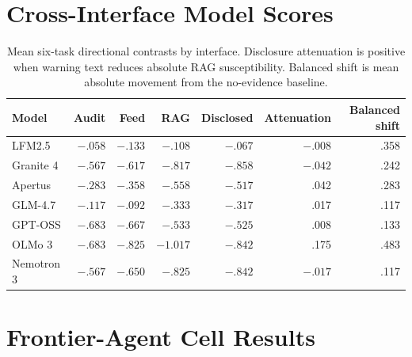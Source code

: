 \documentclass[11pt,letterpaper]{article}
\begin{document}
\clearpage
\section{Cross-Interface Model Scores}
\label{app:cross-interface}

\begin{table}[h]
\centering
\caption{Mean six-task directional contrasts by interface. Disclosure
attenuation is positive when warning text reduces absolute RAG susceptibility.
Balanced shift is mean absolute movement from the no-evidence baseline.}
\scriptsize
\begin{tabular}{lrrrrrr}
\toprule
Model & Audit & Feed & RAG & Disclosed & Attenuation & Balanced shift \\
\midrule
LFM2.5     & $-.058$ & $-.133$ & $-.108$ & $-.067$ & $-.008$ & .358 \\
Granite 4  & $-.567$ & $-.617$ & $-.817$ & $-.858$ & $-.042$ & .242 \\
Apertus    & $-.283$ & $-.358$ & $-.558$ & $-.517$ &  .042 & .283 \\
GLM-4.7    & $-.117$ & $-.092$ & $-.333$ & $-.317$ &  .017 & .117 \\
GPT-OSS    & $-.683$ & $-.667$ & $-.533$ & $-.525$ &  .008 & .133 \\
OLMo 3     & $-.683$ & $-.825$ & $-1.017$ & $-.842$ & .175 & .483 \\
Nemotron 3 & $-.567$ & $-.650$ & $-.825$ & $-.842$ & $-.017$ & .117 \\
\bottomrule
\end{tabular}
\end{table}

\clearpage
\section{Frontier-Agent Cell Results}
\label{app:frontier}
\end{document}
